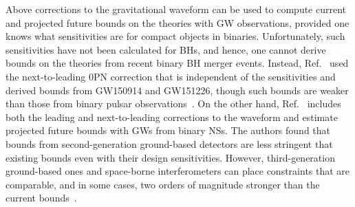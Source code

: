 \documentclass[prd,twocolumn,nofootinbib]{revtex4-1}
\newcommand{\KG}{{\mbox{\tiny kh}}}
\begin{document}
Above corrections to the gravitational waveform can be used to compute current and projected future bounds on the theories with GW observations, provided one knows what sensitivities are for compact objects in binaries. Unfortunately, such sensitivities have not been calculated for BHs, and hence, one cannot derive bounds on the theories from recent binary BH merger events. Instead, Ref.~\cite{Yunes:2016jcc} used the next-to-leading 0PN correction that is independent of the sensitivities and derived bounds from GW150914 and GW151226, though such bounds are weaker than those from binary pulsar observations~\cite{Yagi:2013ava,Yagi:2013qpa}. On the other hand, Ref.~\cite{Hansen:2014ewa} includes both the leading and next-to-leading corrections to the waveform and estimate projected future bounds with GWs from binary NSs. The authors found that bounds from second-generation ground-based detectors are less stringent that existing bounds even with their design sensitivities.
However, third-generation ground-based ones and space-borne interferometers can place constraints that are comparable, and in some cases, two orders of magnitude stronger than the current bounds~\cite{Chamberlain:2017fjl,Hansen:2014ewa}.
  
\end{document}
